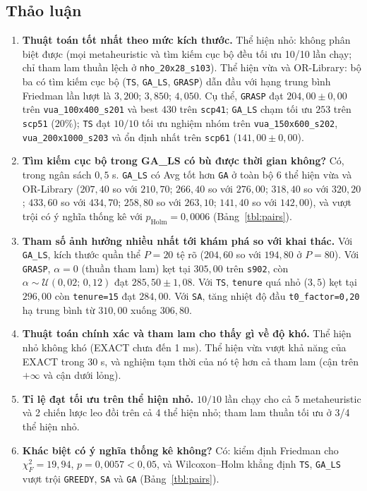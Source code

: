 \documentclass[a4paper,12pt]{article}
\begin{document}
\subsection{Thảo luận}
\begin{enumerate}
\item \textbf{Thuật toán tốt nhất theo mức kích thước.} Thể hiện nhỏ: không phân biệt được (mọi metaheuristic và tìm kiếm cục bộ đều tối ưu 10/10 lần chạy; chỉ tham lam thuần lệch ở \texttt{nho\_20x28\_s103}). Thể hiện vừa và OR-Library: bộ ba có tìm kiếm cục bộ (\texttt{TS}, \texttt{GA\_LS}, \texttt{GRASP}) dẫn đầu với hạng trung bình Friedman lần lượt là $3{,}200$; $3{,}850$; $4{,}050$. Cụ thể, \texttt{GRASP} đạt $204{,}00\pm0{,}00$ trên \texttt{vua\_100x400\_s201} và best $430$ trên \texttt{scp41}; \texttt{GA\_LS} chạm tối ưu $253$ trên \texttt{scp51} ($20\%$); \texttt{TS} đạt $10/10$ tối ưu nghiệm nhóm trên \texttt{vua\_150x600\_s202}, \texttt{vua\_200x1000\_s203} và ổn định nhất trên \texttt{scp61} ($141{,}00\pm0{,}00$).
\item \textbf{Tìm kiếm cục bộ trong GA\_LS có bù được thời gian không?} Có, trong ngân sách $0{,}5$ s. \texttt{GA\_LS} có Avg tốt hơn \texttt{GA} ở toàn bộ 6 thể hiện vừa và OR-Library ($207{,}40$ so với $210{,}70$; $266{,}40$ so với $276{,}00$; $318{,}40$ so với $320{,}20$; $433{,}60$ so với $434{,}70$; $258{,}80$ so với $263{,}10$; $141{,}40$ so với $142{,}00$), và vượt trội có ý nghĩa thống kê với $p_{\text{Holm}} = 0{,}0006$ (Bảng~\ref{tbl:pairs}).
\item \textbf{Tham số ảnh hưởng nhiều nhất tới khám phá so với khai thác.} Với \texttt{GA\_LS}, kích thước quần thể $P=20$ tệ rõ ($204{,}60$ so với $194{,}80$ ở $P=80$). Với \texttt{GRASP}, $\alpha=0$ (thuần tham lam) kẹt tại $305{,}00$ trên \texttt{s902}, còn $\alpha \sim \mathcal{U}(0{,}02;\,0{,}12)$ đạt $285{,}50\pm1{,}08$. Với \texttt{TS}, \texttt{tenure} quá nhỏ ($3,5$) kẹt tại $296{,}00$ còn \texttt{tenure=15} đạt $284{,}00$. Với \texttt{SA}, tăng nhiệt độ đầu \texttt{t0\_factor=0,20} hạ trung bình từ $310{,}00$ xuống $306{,}80$.
\item \textbf{Thuật toán chính xác và tham lam cho thấy gì về độ khó.} Thể hiện nhỏ không khó (EXACT chưa đến 1 ms). Thể hiện vừa vượt khả năng của EXACT trong 30 s, và nghiệm tạm thời của nó tệ hơn cả tham lam (cận trên $+\infty$ và cận dưới lỏng).
\item \textbf{Tỉ lệ đạt tối ưu trên thể hiện nhỏ.} $10/10$ lần chạy cho cả 5 metaheuristic và 2 chiến lược leo đồi trên cả 4 thể hiện nhỏ; tham lam thuần tối ưu ở 3/4 thể hiện nhỏ.
\item \textbf{Khác biệt có ý nghĩa thống kê không?} Có: kiểm định Friedman cho $\chi^2_F=19{,}94$, $p=0{,}0057 < 0{,}05$, và Wilcoxon--Holm khẳng định \texttt{TS}, \texttt{GA\_LS} vượt trội \texttt{GREEDY}, \texttt{SA} và \texttt{GA} (Bảng~\ref{tbl:pairs}).
\end{enumerate}
\end{document}
